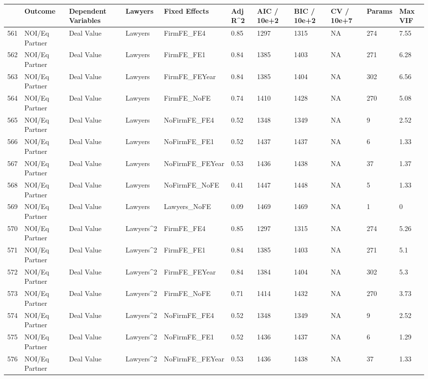 \documentclass{article}
\begin{document}
\begin{table}[H]
\centering
\begin{tabular}{rllllllllll}
  \hline
 & Outcome & Dependent Variables & Lawyers & Fixed Effects & Adj R^2 & AIC / 10e+2 & BIC / 10e+2 & CV / 10e+7 & Params & Max VIF \\
  \hline
561 & NOI/Eq Partner & Deal Value & Lawyers & FirmFE\_FE4 & 0.85 & 1297 & 1315 & NA & 274 & 7.55 \\
  562 & NOI/Eq Partner & Deal Value & Lawyers & FirmFE\_FE1 & 0.84 & 1385 & 1403 & NA & 271 & 6.28 \\
  563 & NOI/Eq Partner & Deal Value & Lawyers & FirmFE\_FEYear & 0.84 & 1385 & 1404 & NA & 302 & 6.56 \\
  564 & NOI/Eq Partner & Deal Value & Lawyers & FirmFE\_NoFE & 0.74 & 1410 & 1428 & NA & 270 & 5.08 \\
  565 & NOI/Eq Partner & Deal Value & Lawyers & NoFirmFE\_FE4 & 0.52 & 1348 & 1349 & NA & 9 & 2.52 \\
  566 & NOI/Eq Partner & Deal Value & Lawyers & NoFirmFE\_FE1 & 0.52 & 1437 & 1437 & NA & 6 & 1.33 \\
  567 & NOI/Eq Partner & Deal Value & Lawyers & NoFirmFE\_FEYear & 0.53 & 1436 & 1438 & NA & 37 & 1.37 \\
  568 & NOI/Eq Partner & Deal Value & Lawyers & NoFirmFE\_NoFE & 0.41 & 1447 & 1448 & NA & 5 & 1.33 \\
  569 & NOI/Eq Partner & Deal Value & Lawyers & Lawyers\_NoFE & 0.09 & 1469 & 1469 & NA & 1 & 0 \\
  570 & NOI/Eq Partner & Deal Value & Lawyers^2 & FirmFE\_FE4 & 0.85 & 1297 & 1315 & NA & 274 & 5.26 \\
  571 & NOI/Eq Partner & Deal Value & Lawyers^2 & FirmFE\_FE1 & 0.84 & 1385 & 1403 & NA & 271 & 5.1 \\
  572 & NOI/Eq Partner & Deal Value & Lawyers^2 & FirmFE\_FEYear & 0.84 & 1384 & 1404 & NA & 302 & 5.3 \\
  573 & NOI/Eq Partner & Deal Value & Lawyers^2 & FirmFE\_NoFE & 0.71 & 1414 & 1432 & NA & 270 & 3.73 \\
  574 & NOI/Eq Partner & Deal Value & Lawyers^2 & NoFirmFE\_FE4 & 0.52 & 1348 & 1349 & NA & 9 & 2.52 \\
  575 & NOI/Eq Partner & Deal Value & Lawyers^2 & NoFirmFE\_FE1 & 0.52 & 1436 & 1437 & NA & 6 & 1.29 \\
  576 & NOI/Eq Partner & Deal Value & Lawyers^2 & NoFirmFE\_FEYear & 0.53 & 1436 & 1438 & NA & 37 & 1.33 \\

\end{tabular}
\end{table}
\end{document}
